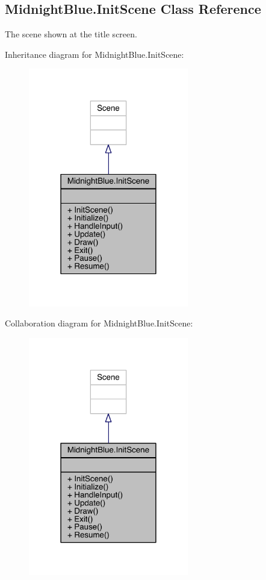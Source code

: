 \hypertarget{class_midnight_blue_1_1_init_scene}{}\subsection{Midnight\+Blue.\+Init\+Scene Class Reference}
\label{class_midnight_blue_1_1_init_scene}


The scene shown at the title screen.  




Inheritance diagram for Midnight\+Blue.\+Init\+Scene\+:\nopagebreak
\begin{figure}[H]
\begin{center}
\leavevmode
\includegraphics[width=198pt]{class_midnight_blue_1_1_init_scene__inherit__graph}
\end{center}
\end{figure}


Collaboration diagram for Midnight\+Blue.\+Init\+Scene\+:\nopagebreak
\begin{figure}[H]
\begin{center}
\leavevmode
\includegraphics[width=198pt]{class_midnight_blue_1_1_init_scene__coll__graph}
\end{center}
\end{figure}
